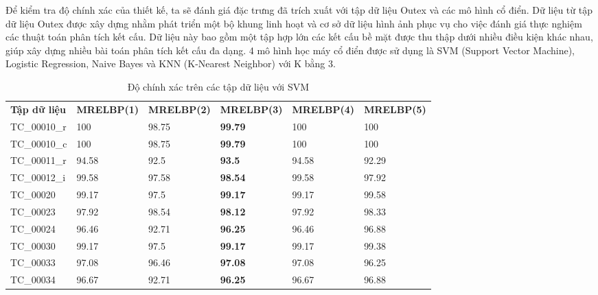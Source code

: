 Để kiểm tra độ chính xác của thiết kế, ta sẽ đánh giá đặc trưng đã trích xuất với tập dữ liệu Outex\cite{outex} và các mô hình cổ điển. Dữ liệu từ tập dữ liệu Outex được xây dựng nhằm phát triển một bộ khung linh hoạt và cơ sở dữ liệu hình ảnh phục vụ cho việc đánh giá thực nghiệm các thuật toán phân tích kết cấu. Dữ liệu này bao gồm một tập hợp lớn các kết cấu bề mặt được thu thập dưới nhiều điều kiện khác nhau, giúp xây dựng nhiều bài toán phân tích kết cấu đa dạng. 4 mô hình học máy cổ điển được sử dụng là SVM (Support Vector Machine), Logistic Regression, Naive Bayes và KNN (K-Nearest Neighbor) với K bằng 3. 



\begin{table}[!ht]
	\centering
	\renewcommand{\arraystretch}{1.2}
		\caption{Độ chính xác trên các tập dữ liệu với SVM}
	\begin{tabular}{|p{2.5cm} p{2.5cm} p{2.5cm} p{2.5cm} p{2.5cm} p{2.5cm}|}
		\hline
		\rowcolor{gray!30}
		\textbf{Tập dữ liệu} & \textbf{MRELBP(1)}  & \textbf{MRELBP(2)} & \textbf{MRELBP(3) } &  \textbf{MRELBP(4)} & \textbf{MRELBP(5)}  \\
		TC\_00010\_r & 100 &98.75 & \textbf{99.79 }& 100 & 100
		\\ \hline
		TC\_00010\_c & 100 & 98.75 & \textbf{99.79} & 100 & 100
		\\ \hline
		TC\_00011\_r & 94.58 &92.5 & \textbf{93.5} & 94.58 & 92.29
		\\ \hline
		TC\_00012\_i & 99.58 & 97.58 & \textbf{98.54} & 99.58 & 97.92
		\\ \hline
		TC\_00020 & 99.17 & 97.5 & \textbf{99.17} & 99.17 & 99.58
		\\ \hline
		TC\_00023 & 97.92 &98.54 & \textbf{98.12} & 97.92 & 98.33
		\\ \hline
		TC\_00024 & 96.46 & 92.71 & \textbf{96.25} & 96.46 & 96.88
		\\ \hline
		TC\_00030 & 99.17 & 97.5 & \textbf{99.17} & 99.17 & 99.38
		\\ \hline
		TC\_00033 & 97.08 & 96.46 & \textbf{97.08} & 97.08 & 96.25
		\\ \hline
		TC\_00034 & 96.67 & 92.71 & \textbf{96.25} & 96.67 & 96.88
		\\ \hline
	\end{tabular}

	\label{tab:svm}
\end{table}

